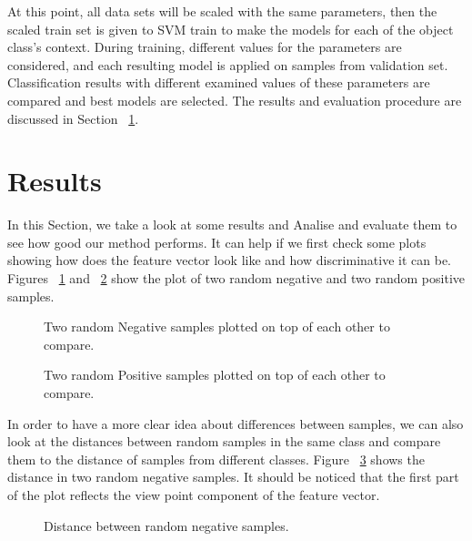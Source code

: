 At this point, all data sets will be scaled with the same parameters, then the scaled train set is given to SVM train 
to make the models for each of the object class's context. 
During training, different values for the parameters are considered, and each resulting model is applied on samples from validation
set. 
Classification results with different examined values of these parameters are compared and best models are selected. 
The results and evaluation procedure are discussed in Section ~\ref{Results.sec}.

\section{Results}
\label{Results.sec}
In this Section, we take a look at some results and Analise and evaluate them to see how good our method performs.
It can help if we first check some plots showing how does the feature vector look like and how discriminative it can be.
Figures ~\ref{CompareNegHis.figure} and ~\ref{ComparePosHist.figure} show the plot of two random negative and two random 
positive samples.   
\begin{figure}[t]
  \caption[Compare two random negative samples]
  {Two random Negative samples plotted on top of each other to compare.}
  \label{CompareNegHis.figure}
\end{figure}

\begin{figure}[t]
  \caption[Compare two random Positive samples]
  {Two random Positive samples plotted on top of each other to compare.}
  \label{ComparePosHist.figure}
\end{figure}


In order to have a more clear idea about differences between samples, we can also look at the distances between random samples
in the same class and compare them to the distance of samples from different classes. 
Figure ~\ref{DistanceOFTwoNegHist.figure} shows the distance in two random negative samples. 
It should be noticed that the first part of the plot reflects the view point component of the feature vector.
 
\begin{figure}[t]
  \caption[Distance between random negative samples]
  {Distance between random negative samples.}
  \label{DistanceOFTwoNegHist.figure}
\end{figure}

